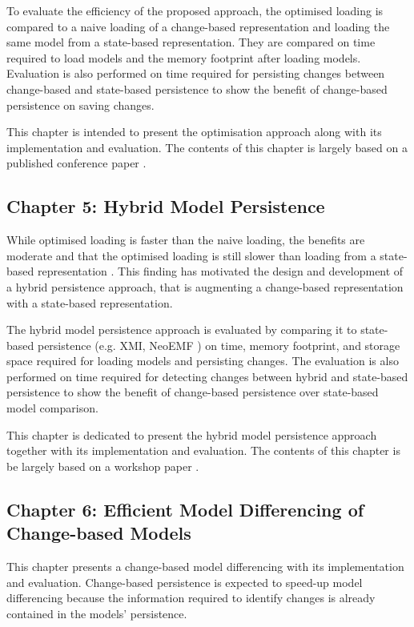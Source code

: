 To evaluate the efficiency of the proposed approach, the optimised loading is compared to a naive loading of a change-based representation and loading the same model from a state-based representation. They are compared on time required to load models and the memory footprint after loading models. Evaluation is also performed on time required for persisting changes between change-based and state-based persistence to show the benefit of change-based persistence on saving changes. 

This chapter is intended to present the optimisation approach along with its implementation and evaluation. The contents of this chapter is largely based on a published conference paper \cite{yohannis2018towards}. 

\subsection{Chapter 5: Hybrid Model Persistence}
\label{sec:chapter_5_hybrid_model_persistence}
While optimised loading is faster than the naive loading, the benefits are moderate and that the optimised loading is still slower than loading from a state-based representation \cite{DBLP:conf/models/YohannisRPK18}. This finding has motivated the design and development of a hybrid persistence approach, that is augmenting a change-based representation with a state-based representation. 

The hybrid model persistence approach is evaluated by comparing it to state-based persistence (e.g. XMI, NeoEMF \cite{daniel2016neoemf}) on time, memory footprint, and storage space required for loading models and persisting changes. The evaluation is also performed on time required for detecting changes between hybrid and state-based persistence to show the benefit of change-based persistence over state-based model comparison. 

This chapter is dedicated to present the hybrid model persistence approach together with its implementation and evaluation. The contents of this chapter is be largely based on a workshop paper \cite{DBLP:conf/models/YohannisRPK18}.

\subsection{Chapter 6: Efficient Model Differencing of Change-based Models}
\label{sec:chapter_6_model_differencing}
This chapter presents a change-based model differencing with its implementation and evaluation. Change-based persistence is expected to speed-up model differencing because the information required to identify changes is already contained in the models' persistence. 

